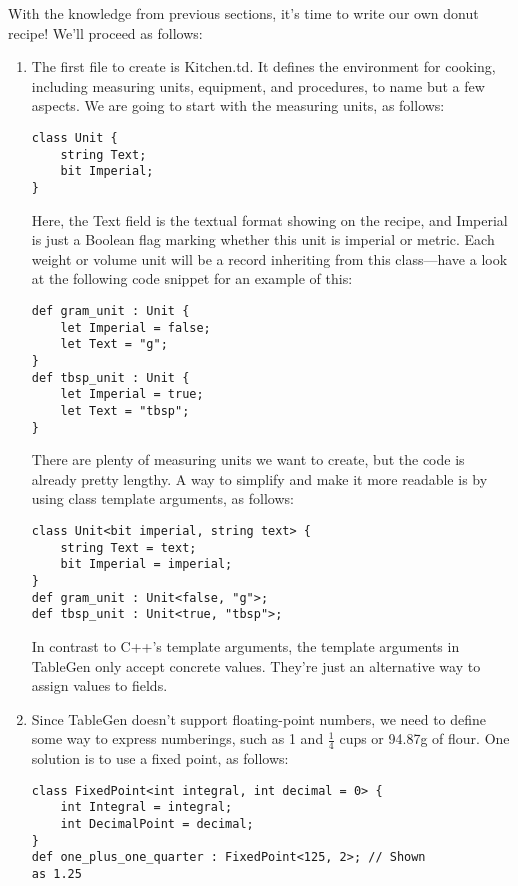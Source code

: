 With the knowledge from previous sections, it's time to write our own donut recipe! We'll proceed as follows:

\begin{enumerate}
\item The first file to create is Kitchen.td. It defines the environment for cooking, including measuring units, equipment, and procedures, to name but a few aspects. We are going to start with the measuring units, as follows:

\begin{lstlisting}[style=styleCXX]
class Unit {
	string Text;
	bit Imperial;
}
\end{lstlisting}

Here, the Text field is the textual format showing on the recipe, and Imperial is just a Boolean flag marking whether this unit is imperial or metric. Each weight or volume unit will be a record inheriting from this class—have a look at the following code snippet for an example of this:

\begin{lstlisting}[style=styleCXX]
def gram_unit : Unit {
	let Imperial = false;
	let Text = "g";
}
def tbsp_unit : Unit {
	let Imperial = true;
	let Text = "tbsp";
}
\end{lstlisting}

There are plenty of measuring units we want to create, but the code is already pretty lengthy. A way to simplify and make it more readable is by using class template arguments, as follows:

\begin{lstlisting}[style=styleCXX]
class Unit<bit imperial, string text> {
	string Text = text;
	bit Imperial = imperial;
}
def gram_unit : Unit<false, "g">;
def tbsp_unit : Unit<true, "tbsp">;
\end{lstlisting}

In contrast to C++'s template arguments, the template arguments in TableGen only accept concrete values. They're just an alternative way to assign values to fields.

\item Since TableGen doesn't support floating-point numbers, we need to define some way to express numberings, such as 1 and $\frac{1}{4}$ cups or 94.87g of flour. One solution is to use a fixed point, as follows:

\begin{lstlisting}[style=styleCXX]
class FixedPoint<int integral, int decimal = 0> {
	int Integral = integral;
	int DecimalPoint = decimal;
}
def one_plus_one_quarter : FixedPoint<125, 2>; // Shown
as 1.25
\end{lstlisting}


\end{enumerate}
